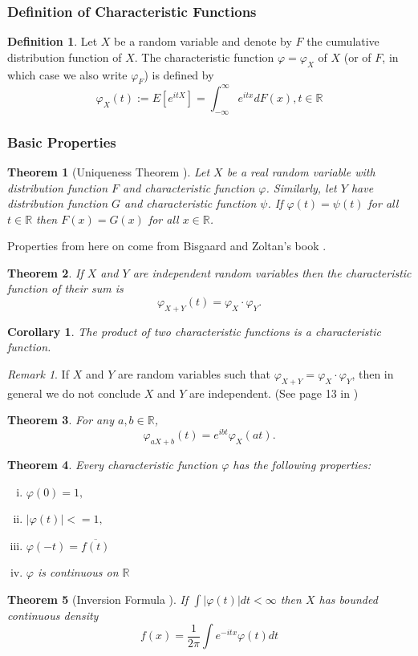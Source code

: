 \documentclass{article}
\theoremstyle{definition}
\newtheorem{definition}{Definition}[section]
\theoremstyle{plain}
\newtheorem{theorem}{Theorem}[section]
\newtheorem{corollary}{Corollary}[theorem]
\theoremstyle{remark}
\newtheorem*{remark}{Remark}
\newcommand{\reals}{\mathbb{R}}
\begin{document}
\subsubsection{Definition of Characteristic Functions}
\begin{definition}
	Let $X$ be a random variable and denote by $F$ the cumulative distribution function of $X$. The characteristic function $\varphi=\varphi_X$ of $X$ (or of $F$, in which case we also write $\varphi_F$) is defined by \textnormal{\cite{cfms}}
	$$\varphi_X(t):=E[e^{itX}]=\int_{-\infty}^\infty e^{itx}dF(x), t\in\reals$$
\end{definition}
\subsubsection{Basic Properties} 
\begin{theorem}[Uniqueness Theorem \cite{uChicago}]
	Let $X$ be a real random variable with distribution function
	$F$ and characteristic function $\varphi$. Similarly, let $Y$ have distribution
	function $G$ and characteristic function $\psi$. If $\varphi(t) = \psi(t)$ for all $t\in\reals$
	then $F(x) = G(x)$ for all $x \in\reals$.
\end{theorem}
Properties from here on come from Bisgaard and Zoltan's book \cite{cfms}.
\begin{theorem}
If $X$ and $Y$ are independent random variables then the characteristic function of their sum is $$\varphi_{X+Y}(t) = \varphi_{X}\cdot\varphi_{Y}.$$
\end{theorem}
\begin{corollary}
The product of two characteristic functions is a characteristic function.
\end{corollary}
\begin{remark}
	If $X$ and $Y$ are random variables such that $\varphi_{X+Y} = \varphi_X\cdot\varphi_Y $, then in general we do not conclude $X$ and $Y$ are independent. (See page 13 in \cite{cfms})
\end{remark} 
\begin{theorem}
For any $a,b \in \reals$, $$\varphi_{aX+b}(t)=e^{ibt}\varphi_X(at).$$
\end{theorem}
\begin{theorem}
Every characteristic function $\varphi$ has the following properties:
\begin{enumerate}[(i)]
	\item $\varphi(0)=1,$
	\item $|\varphi(t)|<=1,$
	\item $\varphi(-t)=\overline{f(t)}$
	\item $\varphi$ is continuous on $\reals$
\end{enumerate}
\end{theorem}
\begin{theorem}[Inversion Formula \cite{pte}]
	If $\int |\varphi(t)| dt < \infty$ then $X$ has bounded continuous density
	$$
	f(x) = \frac1{2\pi} \int e^{-itx}\varphi(t)dt
	$$

\end{theorem}
\end{document}
